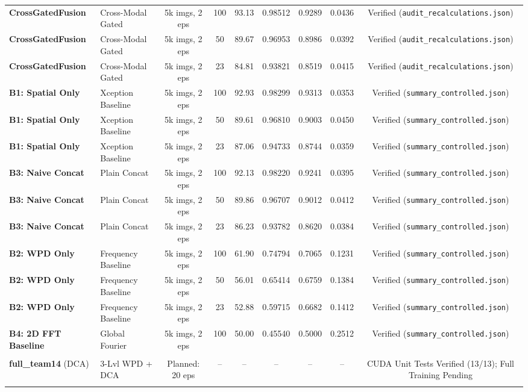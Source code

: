 \documentclass[11pt,a4paper]{article}
\newcommand{\midrule}{\noalign{\smallskip}\hline\noalign{\smallskip}}
\newcommand{\bottomrule}{\noalign{\smallskip}\hline\hline}
\newcommand{\addlinespace}{\noalign{\vspace{0.4em}}}
\begin{document}
\begin{table}[t]
{\begin{tabular}{llccccccc}
\addlinespace
\quad \textbf{CrossGatedFusion} & Cross-Modal Gated & 5k imgs, 2 eps & 100 & 93.13 & 0.98512 & 0.9289 & 0.0436 & Verified (\texttt{audit\_recalculations.json}) \\
\quad \textbf{CrossGatedFusion} & Cross-Modal Gated & 5k imgs, 2 eps & 50  & 89.67 & 0.96953 & 0.8986 & 0.0392 & Verified (\texttt{audit\_recalculations.json}) \\
\quad \textbf{CrossGatedFusion} & Cross-Modal Gated & 5k imgs, 2 eps & 23  & 84.81 & 0.93821 & 0.8519 & 0.0415 & Verified (\texttt{audit\_recalculations.json}) \\
\addlinespace
\quad \textbf{B1: Spatial Only} & Xception Baseline & 5k imgs, 2 eps & 100 & 92.93 & 0.98299 & 0.9313 & 0.0353 & Verified (\texttt{summary\_controlled.json}) \\
\quad \textbf{B1: Spatial Only} & Xception Baseline & 5k imgs, 2 eps & 50  & 89.61 & 0.96810 & 0.9003 & 0.0450 & Verified (\texttt{summary\_controlled.json}) \\
\quad \textbf{B1: Spatial Only} & Xception Baseline & 5k imgs, 2 eps & 23  & 87.06 & 0.94733 & 0.8744 & 0.0359 & Verified (\texttt{summary\_controlled.json}) \\
\addlinespace
\quad \textbf{B3: Naive Concat} & Plain Concat & 5k imgs, 2 eps & 100 & 92.13 & 0.98220 & 0.9241 & 0.0395 & Verified (\texttt{summary\_controlled.json}) \\
\quad \textbf{B3: Naive Concat} & Plain Concat & 5k imgs, 2 eps & 50  & 89.86 & 0.96707 & 0.9012 & 0.0412 & Verified (\texttt{summary\_controlled.json}) \\
\quad \textbf{B3: Naive Concat} & Plain Concat & 5k imgs, 2 eps & 23  & 86.23 & 0.93782 & 0.8620 & 0.0384 & Verified (\texttt{summary\_controlled.json}) \\
\addlinespace
\quad \textbf{B2: WPD Only} & Frequency Baseline & 5k imgs, 2 eps & 100 & 61.90 & 0.74794 & 0.7065 & 0.1231 & Verified (\texttt{summary\_controlled.json}) \\
\quad \textbf{B2: WPD Only} & Frequency Baseline & 5k imgs, 2 eps & 50  & 56.01 & 0.65414 & 0.6759 & 0.1384 & Verified (\texttt{summary\_controlled.json}) \\
\quad \textbf{B2: WPD Only} & Frequency Baseline & 5k imgs, 2 eps & 23  & 52.88 & 0.59715 & 0.6682 & 0.1412 & Verified (\texttt{summary\_controlled.json}) \\
\addlinespace
\quad \textbf{B4: 2D FFT Baseline} & Global Fourier & 5k imgs, 2 eps & 100 & 50.00 & 0.45540 & 0.5000 & 0.2512 & Verified (\texttt{summary\_controlled.json}) \\
\midrule
\multicolumn{9}{l}{\textit{\textbf{Proposed Architecture Status: \texttt{full\_team14} (Spatial + 3-Level WPD + HiFE + Dual Cross-Attention)}}} \\
\quad \textbf{full\_team14} (DCA) & 3-Lvl WPD + DCA & Planned: 20 eps & -- & -- & -- & -- & -- & CUDA Unit Tests Verified (13/13); Full Training Pending \\
\bottomrule
\end{tabular}%
}
\end{table}
\end{document}
